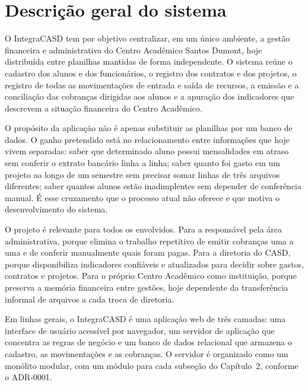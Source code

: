 \documentclass[11pt,a4paper,oneside]{report}
\begin{document}

\chapter{Descrição geral do sistema}

O IntegraCASD tem por objetivo centralizar, em um único ambiente, a gestão financeira e
administrativa do Centro Acadêmico Santos Dumont, hoje distribuída entre planilhas mantidas de
forma independente. O sistema reúne o cadastro dos alunos e dos funcionários, o registro dos
contratos e dos projetos, o registro de todas as movimentações de entrada e saída de recursos, a
emissão e a conciliação das cobranças dirigidas aos alunos e a apuração dos indicadores que
descrevem a situação financeira do Centro Acadêmico.

O propósito da aplicação não é apenas substituir as planilhas por um banco de dados. O ganho
pretendido está no relacionamento entre informações que hoje vivem separadas: saber que determinado
aluno possui mensalidades em atraso sem conferir o extrato bancário linha a linha; saber quanto foi
gasto em um projeto ao longo de um semestre sem precisar somar linhas de três arquivos diferentes;
saber quantos alunos estão inadimplentes sem depender de conferência manual. É esse cruzamento que o
processo atual não oferece e que motiva o desenvolvimento do sistema.

O projeto é relevante para todos os envolvidos. Para a responsável pela área administrativa,
porque elimina o trabalho repetitivo de emitir cobranças uma a uma e de conferir manualmente quais
foram pagas. Para a diretoria do CASD, porque disponibiliza indicadores confiáveis e atualizados
para decidir sobre gastos, contratos e projetos. Para o próprio Centro Acadêmico como instituição,
porque preserva a memória financeira entre gestões, hoje dependente da transferência informal de
arquivos a cada troca de diretoria.

Em linhas gerais, o IntegraCASD é uma aplicação web de três camadas: uma interface de usuário
acessível por navegador, um servidor de aplicação que concentra as regras de negócio e um banco de
dados relacional que armazena o cadastro, as movimentações e as cobranças. O servidor é organizado
como um monólito modular, com um módulo para cada subseção do Capítulo~2, conforme o ADR-0001.
\end{document}
